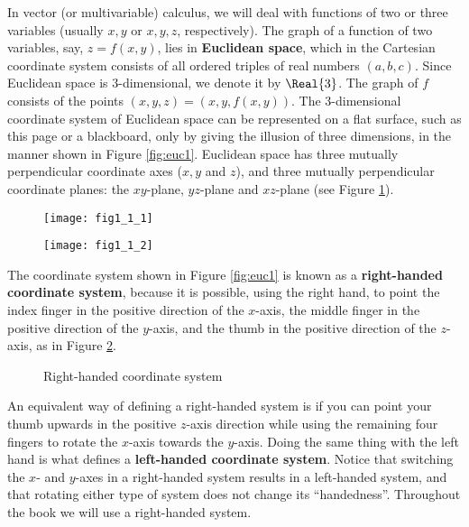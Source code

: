 In vector (or multivariable) calculus, we will deal with functions of two or three variables (usually $x, y$ or
$x, y, z$, respectively).  The graph of a function of two variables, say, $z = f(x,y)$, lies in
\textbf{Euclidean space}, which in the Cartesian coordinate system consists of all ordered
triples of real numbers $(a, b, c)$.  Since Euclidean space is 3-dimensional, we denote it by
$\Real{3}$.  The graph of $f$ consists
of the points $(x, y, z) = (x, y, f(x, y))$.  The 3-dimensional coordinate system of Euclidean space can be
represented on a flat surface, such as this page or a blackboard, only by giving the illusion of three
dimensions, in the manner shown in Figure \ref{fig:euc1}.  Euclidean space has three mutually perpendicular
coordinate axes ($x, y$ and $z$), and three mutually perpendicular coordinate planes:
the $xy$-plane, $yz$-plane and $xz$-plane (see Figure \ref{fig:euc2}).
\newline
\begin{figure}[h]
\begin{minipage}[t]{7.5cm}
 \begin{center}
  \texttt{[image: fig1\_1\_1]}
 \end{center}
 \caption[]{}
 \label{fig:euc1}
\end{minipage}
\begin{minipage}[t]{7.5cm}
 \begin{center}
  \texttt{[image: fig1\_1\_2]}
 \end{center}
 \caption[]{}
 \label{fig:euc2}
\end{minipage}
\end{figure}
\newpage
The coordinate system shown in Figure \ref{fig:euc1} is known as a
\textbf{right-handed coordinate system}, because
it is possible, using the right hand, to point the index finger in the positive direction of the $x$-axis,
the middle finger in the positive direction of the $y$-axis, and the thumb in the positive direction of the
$z$-axis, as in Figure \ref{fig:rhs}.

\begin{figure}[h]
 \begin{center}
  
 \end{center}
 \caption[]{\quad Right-handed coordinate system}
 \label{fig:rhs}
\end{figure}

An equivalent way of defining a right-handed system is if you can point your thumb upwards in the positive
$z$-axis direction while using the remaining four fingers to rotate the $x$-axis towards the $y$-axis.
Doing the same thing
with the left hand is what defines a \textbf{left-handed coordinate system}.
Notice that switching the $x$- and $y$-axes
in a right-handed system results in a left-handed system, and that rotating either type of system does not change its
``handedness''.  Throughout the book we will use a right-handed system.

